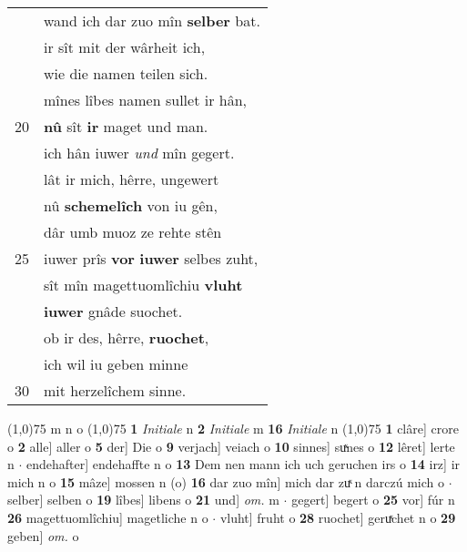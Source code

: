 \documentclass[8pt,a4paper,notitlepage]{article}
\begin{document}
\begin{table}[ht]
\begin{minipage}[t]{0.5\linewidth}
\begin{tabular}{rl}
 & wand ich dar zuo mîn \textbf{selber} bat.\\ 
 & ir sît mit der wârheit ich,\\ 
 & wie die namen teilen sich.\\ 
 & mînes lîbes namen sullet ir hân,\\ 
20 & \textbf{nû} sît \textbf{ir} maget und man.\\ 
 & ich hân iuwer \textit{und} mîn gegert.\\ 
 & lât ir mich, hêrre, ungewert\\ 
 & nû \textbf{schemelîch} von iu gên,\\ 
 & dâr umb muoz ze rehte stên\\ 
25 & iuwer prîs \textbf{vor} \textbf{iuwer} selbes zuht,\\ 
 & sît mîn magettuomlîchiu \textbf{vluht}\\ 
 & \textbf{iuwer} gnâde suochet.\\ 
 & ob ir des, hêrre, \textbf{ruochet},\\ 
 & ich wil iu geben minne\\ 
30 & mit herzelîchem sinne.\\ 
\end{tabular}
\scriptsize
\line(1,0){75} \newline
m n o \newline
\line(1,0){75} \newline
\textbf{1} \textit{Initiale} n  \textbf{2} \textit{Initiale} m  \textbf{16} \textit{Initiale} n  \newline
\line(1,0){75} \newline
\textbf{1} clâre] crore o \textbf{2} alle] aller o \textbf{5} der] Die o \textbf{9} verjach] veiach o \textbf{10} sinnes] suͯnes o \textbf{12} lêret] lerte n  $\cdot$ endehafter] endehaffte n o \textbf{13} Dem nen mann ich uch geruchen irs o \textbf{14} irz] ir mich n o \textbf{15} mâze] mossen n (o) \textbf{16} dar zuo mîn] mich dar zuͯ n darczú mich o  $\cdot$ selber] selben o \textbf{19} lîbes] libens o \textbf{21} und] \textit{om.} m  $\cdot$ gegert] begert o \textbf{25} vor] fúr n \textbf{26} magettuomlîchiu] magetliche n o  $\cdot$ vluht] fruht o \textbf{28} ruochet] geruͯchet n o \textbf{29} geben] \textit{om.} o \newline
\end{minipage}
\end{table}
\newpage
\end{document}
